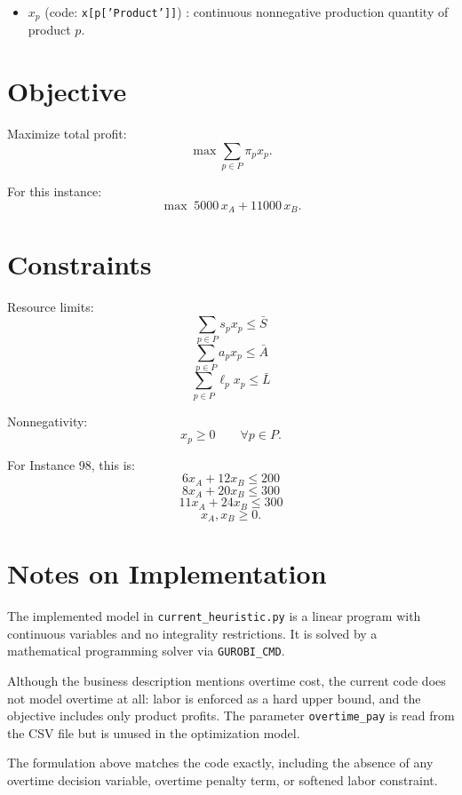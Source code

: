 \begin{itemize}
    \item $x_p$ (code: \texttt{x[p['Product']]}) : continuous nonnegative production quantity of product $p$.
\end{itemize}

\section*{Objective}

Maximize total profit:
\[
\max \sum_{p\in P} \pi_p x_p.
\]

For this instance:
\[
\max \; 5000\,x_A + 11000\,x_B.
\]

\section*{Constraints}

Resource limits:
\[
\sum_{p\in P} s_p x_p \le \bar S
\]
\[
\sum_{p\in P} a_p x_p \le \bar A
\]
\[
\sum_{p\in P} \ell_p x_p \le \bar L
\]

Nonnegativity:
\[
x_p \ge 0 \qquad \forall p\in P.
\]

For Instance 98, this is:
\[
6x_A + 12x_B \le 200
\]
\[
8x_A + 20x_B \le 300
\]
\[
11x_A + 24x_B \le 300
\]
\[
x_A,x_B \ge 0.
\]

\section*{Notes on Implementation}

The implemented model in \texttt{current\_heuristic.py} is a linear program with continuous variables and no integrality restrictions. It is solved by a mathematical programming solver via \texttt{GUROBI\_CMD}.

Although the business description mentions overtime cost, the current code does not model overtime at all: labor is enforced as a hard upper bound, and the objective includes only product profits. The parameter \texttt{overtime\_pay} is read from the CSV file but is unused in the optimization model.

The formulation above matches the code exactly, including the absence of any overtime decision variable, overtime penalty term, or softened labor constraint.
